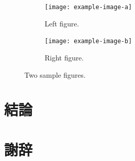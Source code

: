 \documentclass[
    paper=a4paper,      %
    article,            %
    fleqn,              %
    fontsize=10pt,      %
    jafontsize=10pt,    %
    head_space=20mm,    %
    foot_space=25mm,    %
    gutter=20mm,        %
    fore-edge=20mm      %
    ]{jlreq}            %
\begin{document}
\begin{figure}[tp]
  \centering
  \begin{subfigure}{0.45\columnwidth}
      \centering
      \texttt{[image: example-image-a]}
      \caption{Left figure.}
      \label{fig:two_figures_a}
  \end{subfigure}
  \hfill %
  \begin{subfigure}{0.45\columnwidth}
      \centering
      \texttt{[image: example-image-b]}
      \caption{Right figure.}
      \label{fig:two_figures_b}
  \end{subfigure}
  \caption{Two sample figures.}
  \label{fig:two_figures}
\end{figure}

\lipsum[1-4]

\section{結論}


\section*{謝辞}

\lipsum[1-4]
\end{document}
